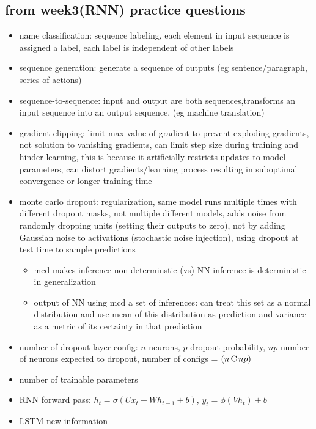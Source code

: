 \documentclass[10pt]{article}
\begin{document}
\subsection*{from week3(RNN) practice questions}
\begin{itemize}[label=\(\star\), leftmargin=1em, itemsep=-0.3em]
    \item name classification: sequence labeling, each element in input sequence is assigned a label, each label is independent of other labels
    \item sequence generation: generate a sequence of outputs (eg sentence/paragraph, series of actions)
    \item sequence-to-sequence: input and output are both sequences,transforms an input sequence into an output sequence, (eg machine translation)
    \item gradient clipping: limit max value of gradient to prevent exploding gradients, not solution to vanishing gradients, can limit step size during training and hinder learning, this is because it artificially restricts updates to model parameters, can distort gradients/learning process resulting in suboptimal convergence or longer training time
    \item monte carlo dropout: regularization, same model runs multiple times with different dropout masks, not multiple different models, adds noise from randomly dropping units (setting their outputs to zero), not by adding Gaussian noise to activations (stochastic noise injection), using dropout at test time to sample predictions
        \begin{itemize}[label=\(\star\),leftmargin=1em, itemsep=-0.3em]
            \item mcd makes inference non-determinstic (vs) NN inference is deterministic in generalization
            \item output of NN using mcd a set of inferences: can treat this set as a normal distribution and use mean of this distribution as prediction and variance as a metric of its certainty in that prediction
        \end{itemize}
    \item number of dropout layer config: $n$ neurons, $p$ dropout probability, $np$ number of neurons expected to dropout, number of configs = $(n\,{\operatorfont{C}}\,np)$
    \item number of trainable parameters
    \item RNN forward pass: $h_t = \sigma(Ux_t + Wh_{t-1} + b)$, $y_t = \phi(Vh_t) + b$
    \item LSTM new information

\end{itemize}
\end{document}
